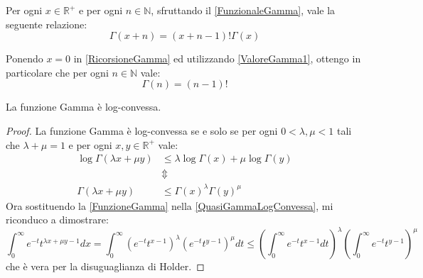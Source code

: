 \begin{remark} \label{RicorsioneGamma}
	Per ogni $x\in\mathbb{R^+}$ e per ogni $n\in\mathbb{N}$, sfruttando il \cref{FunzionaleGamma}, vale la seguente relazione:
	\begin{equation}
		\Gamma(x+n)=(x+n-1)!\Gamma(x)
	\end{equation}
\end{remark}

\begin{remark} \label{ValoreGammaNaturali}
	Ponendo $x=0$ in \cref{RicorsioneGamma} ed utilizzando \cref{ValoreGamma1}, ottengo in particolare che per ogni $n\in\mathbb{N}$ vale:
	\begin{equation}
		\Gamma(n)=(n-1)!
	\end{equation}
\end{remark}


\begin{lemma}\label{GammaLogConvessa}
	La funzione Gamma è log-convessa.
\end{lemma}
\begin{proof}
	La funzione Gamma è log-convessa se e solo se per ogni $0<\lambda,\mu < 1$ tali che $\lambda+\mu=1$
	e per ogni $x,y \in \mathbb{R}^+$ vale:
	\begin{equation}\label{QuasiGammaLogConvessa}
	\begin{split} 
		\log \Gamma(\lambda x+\mu y )  & \le \lambda \log \Gamma(x) + \mu\log \Gamma( y )\\
		& \Updownarrow  \\
		\Gamma(\lambda x+\mu y ) & \le  \Gamma(x)^{\lambda}\Gamma( y )^{\mu}
	\end{split}\end{equation}
	Ora sostituendo la \cref{FunzioneGamma} nella \cref{QuasiGammaLogConvessa}, mi riconduco a dimostrare:
	\begin{equation*}
		\int_0^{\infty}{e^{-t}t^{\lambda x+\mu y-1}dx}=\int_0^{\infty}{(e^{-t}t^{x-1})^\lambda (e^{-t}t^{y-1})^{\mu}dt} \le 
		\left(\int_0^{\infty}{e^{-t}t^{x-1}dt}\right)^\lambda \left(\int_0^{\infty}{e^{-t}t^{y-1}}\right)^{\mu}
	\end{equation*}
	che è vera per la disuguaglianza di Holder.
\end{proof}
 
